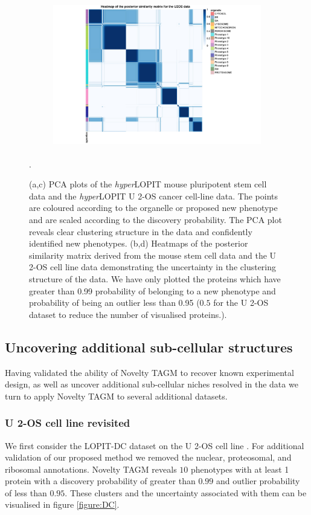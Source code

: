 \documentclass[12pt,english]{article}
\begin{document}
\begin{figure}[ht]
\begin{subfigure}[t]{0.5\textwidth}
	\centering
	\includegraphics[height=2.5in]{heatmapuU2oshl.jpg}
	\caption{}
\end{subfigure}
	\caption{(a,c) PCA plots of the \textit{hyper}LOPIT mouse pluripotent stem cell data and the \textit{hyper}LOPIT U 2-OS cancer cell-line data. The points are coloured according to the organelle or proposed new phenotype and are scaled according to the discovery probability. The PCA plot reveals clear clustering structure in the data and confidently identified new phenotypes. (b,d) Heatmaps of the posterior similarity matrix derived from the mouse stem cell data and the U 2-OS cell line data demonstrating the uncertainty in the clustering structure of the data. We have only plotted the proteins which have greater than 0.99 probability of belonging to a new phenotype and probability of being an outlier less than 0.95 ($0.5$ for the U 2-OS dataset to reduce the number of visualised proteins.).}
	\label{figure:mouse}.
\end{figure}
\clearpage
\subsection{Uncovering additional sub-cellular structures}
Having validated the ability of Novelty TAGM to recover known experimental design, as well as uncover additional sub-cellular niches resolved in the data we turn to apply Novelty TAGM to several additional datasets.

\subsubsection{U 2-OS cell line revisited}
 We first consider the LOPIT-DC dataset on the U 2-OS cell line \citep{DC:2018}. For additional validation of our proposed method we removed the nuclear, proteosomal, and ribosomal annotations. Novelty TAGM reveals $10$ phenotypes with at least 1 protein with a discovery probability of greater than $0.99$ and outlier probability of less than $0.95$. These clusters and the uncertainty associated with them can be visualised in figure \ref{figure:DC}.
\end{document}
